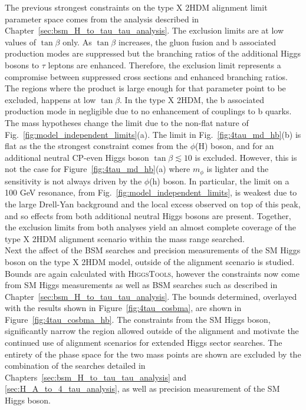 The previous strongest constraints on the type X \ac{2HDM} alignment limit parameter space comes from the analysis described in Chapter~\ref{sec:bsm_H_to_tau_tau_analysis}.
The exclusion limits are at low values of $\tan\beta$ only.
As $\tan\beta$ increases, the gluon fusion and b associated production modes are suppressed but the branching ratios of the additional Higgs bosons to $\tau$ leptons are enhanced.
Therefore, the exclusion limit represents a compromise between suppressed cross sections and enhanced branching ratios. 
The regions where the product is large enough for that parameter point to be excluded, happens at low $\tan\beta$.
In the type X \ac{2HDM}, the b associated production mode in negligible due to no enhancement of couplings to b quarks.
The mass hypotheses change the limit due to the non-flat nature of Fig.~\ref{fig:model_independent_limits}(a).
The limit in Fig.~\ref{fig:4tau_md_hb}(b) is flat as the the strongest constraint comes from the $\phi$(H) boson, and for an additional neutral \ac{CP}-even Higgs boson $\tan\beta \lesssim 10$ is excluded.
However, this is not the case for Figure~\ref{fig:4tau_md_hb}(a) where $m_{\phi}$ is lighter and the sensitivity is not always driven by the $\phi$(h) boson.
In particular, the limit on a 100 GeV resonance, from Fig.~\ref{fig:model_independent_limits}, is weakest due to the large Drell-Yan background and the local excess observed on top of this peak, and so effects from both additional neutral Higgs bosons are present.
Together, the exclusion limits from both analyses yield an almost complete coverage of the type X 2HDM alignment scenario within the mass range searched. \\

Next the affect of the \ac{BSM} searches and precision measurements of the \ac{SM} Higgs boson on the type X \ac{2HDM} model, outside of the alignment scenario is studied.
Bounds are again calculated with \textsc{HiggsTools}, however the constraints now come from \ac{SM} Higgs measurements as well as \ac{BSM} searches such as described in Chapter~\ref{sec:bsm_H_to_tau_tau_analysis}.
The bounds determined, overlayed with the results shown in Figure~\ref{fig:4tau_cosbma}, are shown in Figure~\ref{fig:4tau_cosbma_hb}.
The constraints from the \ac{SM} Higgs boson, significantly narrow the region allowed outside of the alignment and motivate the continued use of alignment scenarios for extended Higgs sector searches.
The entirety of the phase space for the two mass points are shown are excluded by the combination of the searches detailed in Chapters~\ref{sec:bsm_H_to_tau_tau_analysis} and \ref{sec:H_A_to_4_tau_analysis}, as well as precision measurement of the \ac{SM} Higgs boson.

